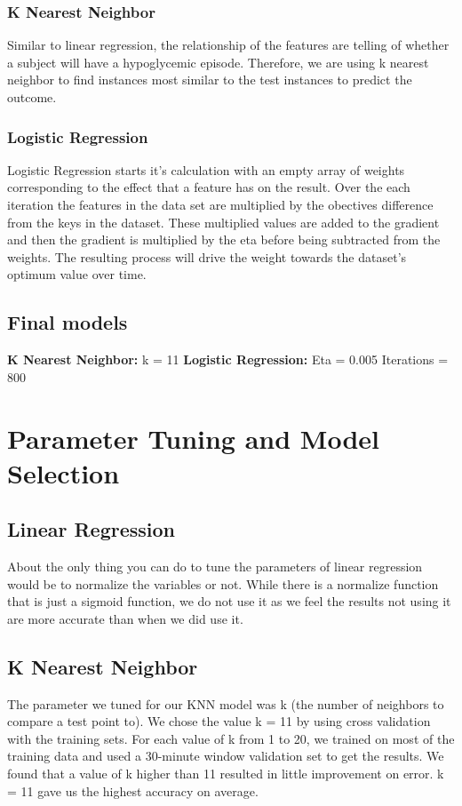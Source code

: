 \documentclass[11pt,a4paper]{article}
\begin{document}
\subsubsection{K Nearest Neighbor}
Similar to linear regression, the relationship of the features are telling of whether a subject will have a hypoglycemic episode. Therefore, we are using k nearest neighbor to find instances most similar to the test instances to predict the outcome.
\subsubsection{Logistic Regression}
Logistic Regression starts it's calculation with an empty array of weights corresponding to the effect that a feature has on the result. Over the each iteration the features in the data set are multiplied by the obectives difference from the keys in the dataset. These multiplied values are added to the gradient and then the gradient is multiplied by the eta before being subtracted from the weights. The resulting process will drive the weight towards the dataset's optimum value over time.

\subsection{Final models}
\textbf{K Nearest Neighbor: }k = 11
\textbf{Logistic Regression: }Eta = 0.005  Iterations = 800


\section{Parameter Tuning and Model Selection}
\subsection{Linear Regression}
About the only thing you can do to tune the parameters of linear regression would be to normalize the variables or not. While there is a normalize function that is just a sigmoid function, we do not use it as we feel the results not using it are more accurate than when we did use it.
\subsection{K Nearest Neighbor}
The parameter we tuned for our KNN model was k (the number of neighbors to compare a test point to). We chose the value k = 11 by using cross validation with the training sets. For each value of k from 1 to 20, we trained on most of the training data and used a 30-minute window validation set to get the results. We found that a value of k higher than 11 resulted in little improvement on error. k = 11 gave us the highest accuracy on average.
\end{document}
